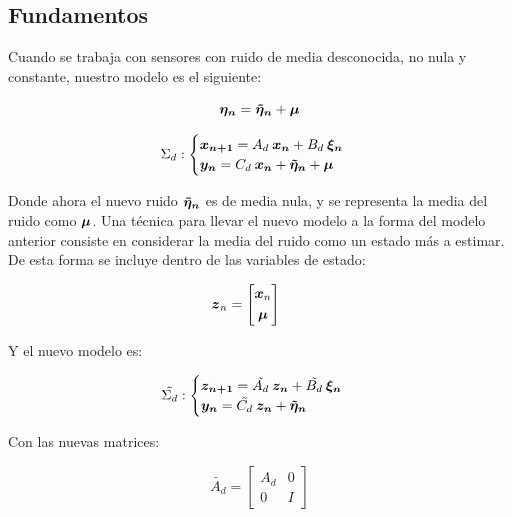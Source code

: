 \subsection{Fundamentos}

	Cuando se trabaja con sensores con ruido de media desconocida, no nula y constante, nuestro modelo es el siguiente:

	\begin{equation*}
		\boldsymbol{\eta_{n}} = \boldsymbol{\tilde{\eta}_{n}} + \boldsymbol{\mu}
	\end{equation*}

	\begin{equation*}
		\Sigma_{d}:
		\begin{cases}
			\boldsymbol{x_{n + 1}} = A_{d}\: \boldsymbol{x_{n}} + B_{d} \: \boldsymbol{\xi_{n}} \\
			\boldsymbol{y_{n}} = C_{d}\: \boldsymbol{x_{n}} + \boldsymbol{\tilde{\eta}_{n}} + \boldsymbol{\mu}
		\end{cases}
	\end{equation*}

	Donde ahora el nuevo ruido $\boldsymbol{\tilde{\eta}_{n}}$ es de media nula, y se representa la media del ruido como $\boldsymbol{\mu}$. Una técnica para llevar el nuevo modelo a la forma del modelo anterior consiste en considerar la media del ruido como un estado más a estimar. De esta forma se incluye dentro de las variables de estado:

	\begin{equation*}
		\vect{z}_{n} = \begin{bmatrix} \vect{x}_{n} \\[0.3em] \vect{\mu}\end{bmatrix} \qquad%
	\end{equation*}
	
	Y el nuevo modelo es:
	
	\begin{equation*}
		\tilde{\Sigma_{d}}:
		\begin{cases}
			\boldsymbol{z_{n + 1}} = \tilde{A_{d}}\: \boldsymbol{z_{n}} + \tilde{B_{d}} \: \boldsymbol{\xi_{n}} \\
			\boldsymbol{y_{n}} = \tilde{C_{d}}\: \boldsymbol{z_{n}} + \boldsymbol{\tilde{\eta}_{n}}
		\end{cases}
	\end{equation*}

	Con las nuevas matrices:
	
	\begin{equation*}
			\tilde{A_{d}} = \begin{bmatrix} A_{d} & 0 \\[0.3em] 0 & I \end{bmatrix}
	\end{equation*}
	
